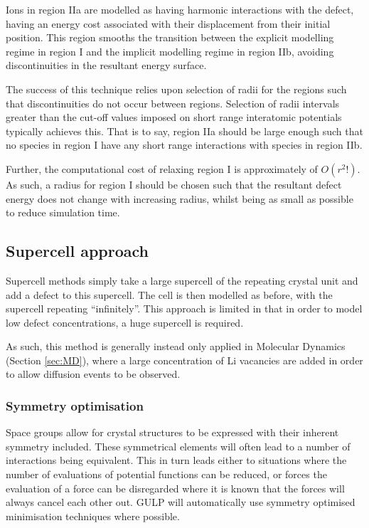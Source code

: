 Ions in region IIa are modelled as having harmonic interactions with the defect, having an energy cost associated with their displacement from their initial position.
This region smooths the transition between the explicit modelling regime in region I and the implicit modelling regime in region IIb, avoiding discontinuities in the resultant energy surface.

The success of this technique relies upon selection of radii for the regions such that discontinuities do not occur between regions.
Selection of radii intervals greater than the cut-off values imposed on short range interatomic potentials typically achieves this.
That is to say, region IIa should be large enough such that no species in region I have any short range interactions with species in region IIb.

Further, the computational cost of relaxing region I is approximately of $O(r^2!)$.
As such, a radius for region I should be chosen such that the resultant defect energy does not change with increasing radius, whilst being as small as possible to reduce simulation time.

\subsection{Supercell approach}  
Supercell methods simply take a large supercell of the repeating crystal unit and add a defect to this supercell.
The cell is then modelled as before, with the supercell repeating ``infinitely''.
This approach is limited in that in order to model low defect concentrations, a huge supercell is required.

As such, this method is generally instead only applied in Molecular Dynamics (Section \ref{sec:MD}), where a large concentration of Li vacancies are added in order to allow diffusion events to be observed.

\subsubsection{Symmetry optimisation}
Space groups allow for crystal structures to be expressed with their inherent symmetry included.
These symmetrical elements will often lead to a number of interactions being equivalent.
This in turn leads either to situations where the number of evaluations of potential functions can be reduced, or forces the evaluation of a force can be disregarded where it is known that the forces will always cancel each other out.
GULP will automatically use symmetry optimised minimisation techniques where possible.


